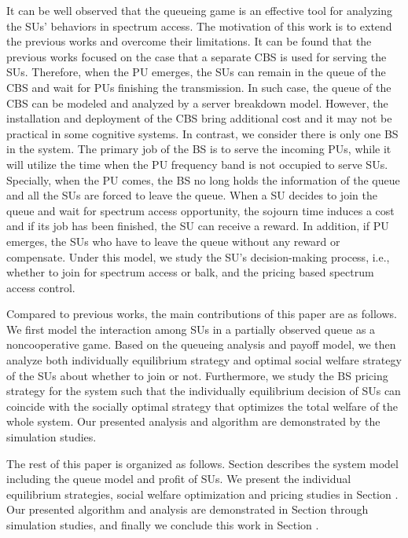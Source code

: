 \documentclass[journal]{IEEEtran}
\begin{document}
It can be well observed that the queueing game is an effective tool
for analyzing the SUs' behaviors in spectrum access. The motivation
of this work is to extend the previous works and overcome their
limitations. It can be found that the previous works focused on
the case that a separate CBS is used for serving the SUs. Therefore, when the PU
emerges, the SUs can remain in the queue of the CBS and wait for PUs finishing
the transmission. In such case, the queue of the CBS can be modeled and
analyzed by a server breakdown model. However, the installation and deployment of
the CBS bring additional cost and it may not be practical in some
cognitive systems. In contrast, we consider there is only one BS
in the system. The primary job of the BS is to serve the incoming PUs,
while it will utilize the time when the PU frequency band is not occupied to
serve SUs. Specially, when the PU comes, the BS no long holds the
information of the queue and all the SUs are forced to leave the queue.
When a SU decides to join the queue and wait for spectrum access opportunity, the sojourn time induces a
cost and if its job has been finished, the SU can receive a reward. In
addition, if PU emerges, the SUs who have to leave the queue
without any reward or compensate. Under this model, we study the
SU's decision-making process, i.e., whether to join for spectrum access or balk, and
the pricing based spectrum access control. \par

Compared to previous works, the main contributions of this paper
are as follows. We first model the interaction among SUs in a
partially observed queue as a noncooperative game. Based on the
queueing analysis and payoff model, we then analyze both
individually equilibrium strategy and optimal social welfare
strategy of the SUs about whether to join or not. Furthermore, we
study the BS pricing strategy for the system such that the
individually equilibrium decision of SUs can coincide with the
socially optimal strategy that optimizes the total welfare of the
whole system. Our presented analysis and algorithm are
demonstrated by the simulation studies. \par

The rest of this paper is organized as follows. Section
\uppercase\expandafter{} describes the system model
including the queue model and profit of SUs. We present the individual
equilibrium strategies, social welfare optimization and pricing
studies in Section \uppercase\expandafter{}. Our presented algorithm and analysis are demonstrated in Section
\uppercase\expandafter{} through simulation studies,
and finally we conclude this work in Section
\uppercase\expandafter{}.
\end{document}
